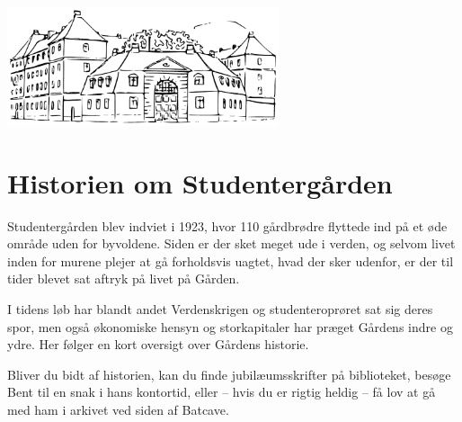 \documentclass[11pt,article,twoside,openany,danish,extrafontsizes]{memoir} %
\begin{document}
\begin{center}

\vfill
\includegraphics[width=0.6\textwidth]{fig/gaarden-tegning}

\end{center}



\clearpage


\chapter{Historien om Studentergården}
\label{chap:historie}
Studentergården blev indviet i 1923, hvor 110 gårdbrødre flyttede ind på et øde område uden for byvoldene. Siden er der sket meget ude i verden, og selvom livet inden for murene plejer at gå forholdsvis uagtet, hvad der sker udenfor, er der til tider blevet sat aftryk på livet på Gården.

I tidens løb har blandt andet Verdenskrigen og studenteroprøret sat sig deres spor, men også økonomiske hensyn og storkapitaler har præget Gårdens indre og ydre. Her følger en kort oversigt over Gårdens historie.

Bliver du bidt af historien, kan du finde jubilæumsskrifter på biblioteket, besøge Bent til en snak i hans kontortid, eller -- hvis du er rigtig heldig -- få lov at gå med ham i arkivet ved siden af Batcave.
\end{document}
